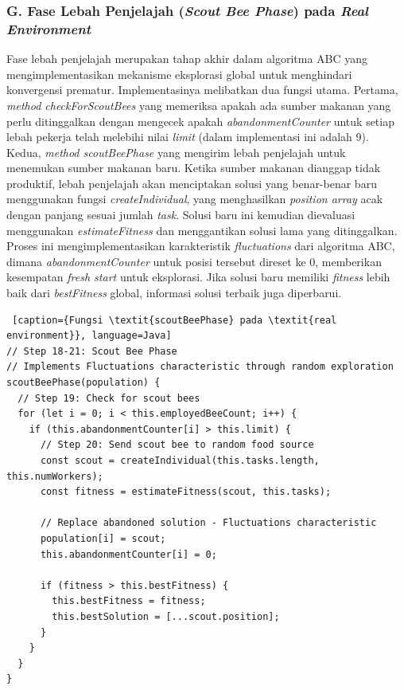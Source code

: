 \subsubsection{G. Fase Lebah Penjelajah (\textit{Scout Bee Phase}) pada \textit{Real Environment}}
Fase lebah penjelajah merupakan tahap akhir dalam algoritma ABC yang mengimplementasikan mekanisme eksplorasi global untuk menghindari konvergensi prematur. Implementasinya melibatkan dua fungsi utama. Pertama, \textit{method checkForScoutBees} yang memeriksa apakah ada sumber makanan yang perlu ditinggalkan dengan mengecek apakah \textit{abandonmentCounter} untuk setiap lebah pekerja telah melebihi nilai \textit{limit} (dalam implementasi ini adalah 9). Kedua, \textit{method scoutBeePhase} yang mengirim lebah penjelajah untuk menemukan sumber makanan baru. Ketika sumber makanan dianggap tidak produktif, lebah penjelajah akan menciptakan solusi yang benar-benar baru menggunakan fungsi \textit{createIndividual}, yang menghasilkan \textit{position array} acak dengan panjang sesuai jumlah \textit{task}. Solusi baru ini kemudian dievaluasi menggunakan \textit{estimateFitness} dan menggantikan solusi lama yang ditinggalkan. Proses ini mengimplementasikan karakteristik \textit{fluctuations} dari algoritma ABC, dimana \textit{abandonmentCounter} untuk posisi tersebut direset ke 0, memberikan kesempatan \textit{fresh start} untuk eksplorasi. Jika solusi baru memiliki \textit{fitness} lebih baik dari \textit{bestFitness} global, informasi solusi terbaik juga diperbarui.

\begin{lstlisting} [caption={Fungsi \textit{scoutBeePhase} pada \textit{real environment}}, language=Java]
// Step 18-21: Scout Bee Phase
// Implements Fluctuations characteristic through random exploration
scoutBeePhase(population) {
  // Step 19: Check for scout bees
  for (let i = 0; i < this.employedBeeCount; i++) {
    if (this.abandonmentCounter[i] > this.limit) {
      // Step 20: Send scout bee to random food source
      const scout = createIndividual(this.tasks.length, this.numWorkers);
      const fitness = estimateFitness(scout, this.tasks);
      
      // Replace abandoned solution - Fluctuations characteristic
      population[i] = scout;
      this.abandonmentCounter[i] = 0;

      if (fitness > this.bestFitness) {
        this.bestFitness = fitness;
        this.bestSolution = [...scout.position];
      }
    }
  }
}
\end{lstlisting}

